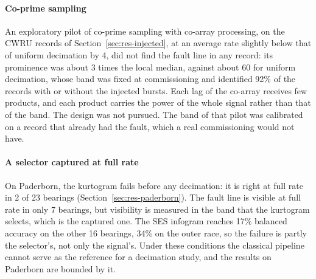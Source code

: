 \paragraph{Co-prime sampling} An exploratory pilot of co-prime sampling with co-array processing,
on the CWRU records of Section~\ref{sec:res-injected}, at an average rate slightly below that of
uniform decimation by 4, did not find the fault line in any record: its prominence was about 3 times
the local median, against about 60 for uniform decimation, whose band was fixed at commissioning and
identified 92\% of the records with or without the injected bursts. Each lag of the co-array
receives few products, and each product carries the power of the whole signal rather than that of
the band. The design was not pursued. The band of that pilot was calibrated on a record that
already had the fault, which a real commissioning would not have.

\paragraph{A selector captured at full rate} On Paderborn, the kurtogram fails before any
decimation: it is right at full rate in 2 of 23 bearings (Section~\ref{sec:res-paderborn}). The
fault line is visible at full rate in only 7 bearings, but visibility is measured in the band that
the kurtogram selects, which is the captured one. The SES infogram reaches 17\% balanced accuracy on
the other 16 bearings, 34\% on the outer race, so the failure is partly the selector's, not only the
signal's. Under these conditions the classical pipeline cannot serve as the reference for a
decimation study, and the results on Paderborn are bounded by it.
